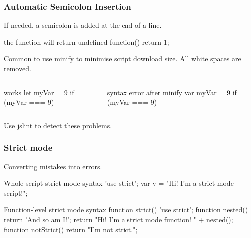 \documentclass[aspectratio=1610]{beamer}
\begin{document}










\begin{frame}[fragile]
  \frametitle{Automatic Semicolon Insertion}
  If needed, a semicolon is added at the end of a line.
\begin{CodeBox}{the function will return undefined}
  function() { return
  1; }
\end{CodeBox}

\vspace{4mm}
Common to use minify to minimise script download size. All white spaces are removed.
\begin{columns}[onlytextwidth]
  \begin{column}{0.35\textwidth}
\begin{CodeBox}{works}
  let myVar = 9
  if (myVar === 9) {
  }
\end{CodeBox}
  \end{column}
  \begin{column}{0.65\textwidth}
\begin{CodeBox}{syntax error after minify}
  var myVar = 9 if (myVar === 9) {}
\end{CodeBox}
  \end{column}
  \begin{column}{0.3\textwidth}  \end{column}
\end{columns}%

\vspace{4mm}
Use jslint to detect these problems.
\end{frame}

\begin{frame}[fragile]
  \frametitle{Strict mode}
Converting mistakes into errors.

\begin{CodeBox}{Whole-script strict mode syntax}
'use strict';
var v = "Hi! I'm a strict mode script!";
\end{CodeBox}

\begin{CodeBox}{Function-level strict mode syntax}
function strict() {
  'use strict';
  function nested() { return 'And so am I!'; }
  return "Hi!  I'm a strict mode function!  " + nested();
}
function notStrict() { return "I'm not strict."; }
\end{CodeBox}


\end{frame}


\end{document}
